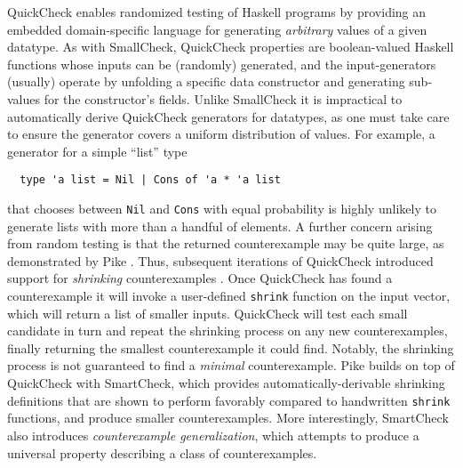 QuickCheck \cite{claessen_quickcheck:_2000,claessen_testing_2002}
enables randomized testing of Haskell programs by providing an embedded
domain-specific language for generating \emph{arbitrary} values of a
given datatype.
%
As with SmallCheck, QuickCheck properties are boolean-valued Haskell
functions whose inputs can be (randomly) generated, and the
input-generators (usually) operate by unfolding a specific data
constructor and generating sub-values for the constructor's
fields.
%
Unlike SmallCheck it is impractical to automatically derive QuickCheck
generators for datatypes, as one must take care to ensure the generator
covers a uniform distribution of values.
%
For example, a generator for a simple ``list'' type
%
\begin{verbatim}
  type 'a list = Nil | Cons of 'a * 'a list
\end{verbatim}
%
that chooses between \texttt{Nil} and \texttt{Cons} with equal
probability is highly unlikely to generate lists with more than a
handful of elements.
%
A further concern arising from random testing is that the returned
counterexample may be quite large, as demonstrated by Pike
\cite{pike_smartcheck:_2014}.
%
Thus, subsequent iterations of QuickCheck introduced support for
\emph{shrinking} counterexamples \cite{hughes_quickcheck_2006}.
%
Once QuickCheck has found a counterexample it will invoke a user-defined
\texttt{shrink} function on the input vector, which will return a list
of smaller inputs.
%
QuickCheck will test each small candidate in turn and repeat the
shrinking process on any new counterexamples, finally returning the
smallest counterexample it could find.
%
Notably, the shrinking process is not guaranteed to find a
\emph{minimal} counterexample.
%
Pike \cite{pike_smartcheck:_2014} builds on top of QuickCheck with
SmartCheck, which provides automatically-derivable shrinking definitions
that are shown to perform favorably compared to handwritten
\texttt{shrink} functions, and produce smaller counterexamples.
%
More interestingly, SmartCheck also introduces \emph{counterexample
  generalization}, which attempts to produce a universal property
describing a class of counterexamples.
%

